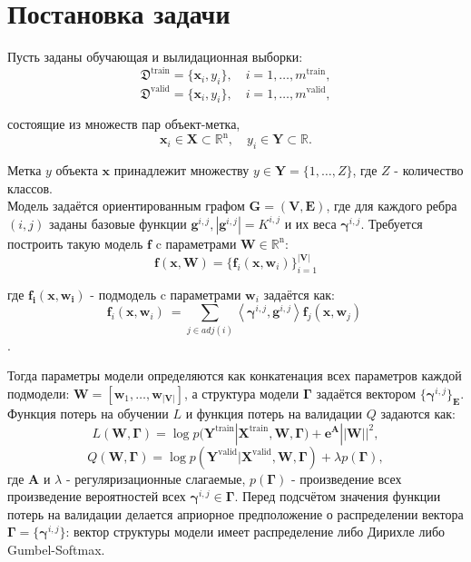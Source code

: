 \documentclass[12pt,twoside]{article}
\begin{document}
\section{Постановка задачи}

Пусть заданы обучающая и вылидационная выборки:
\[
\mathfrak{D}^{\text{train}} = \{\mathbf{x}_i, y_i\}, \quad i=1,\dots,m^{\text{train}},
\]
\[
\mathfrak{D}^{\text{valid}} = \{\mathbf{x}_i, y_i\}, \quad i=1,\dots,m^{\text{valid}},
\]

состоящие из множеств пар объект-метка,
\[
\mathbf{x}_i\in\mathbf{X}\subset\mathbb{R}^{\text{n}},\quad y_i\in\mathbf{Y}\subset\mathbb{R}.
\] 

Метка $y$ объекта $\mathbf{x}$ принадлежит множеству $y\in\mathbf{Y}= \{1,\dots,Z\}$, где $Z$ - количество классов.
\\

Модель задаётся ориентированным графом $\mathbf{G=(V,E)}$, где для каждого ребра $(i,j)$ заданы базовые функции $\mathbf{g}^{i,j}, |\mathbf{g}^{i,j}| = K^{i,j}$ и их веса $\boldsymbol{\gamma}^{i,j}$. Требуется построить такую модель $\mathbf{f}$ c параметрами $\mathbf{W}\in\mathbb{R}^\text{n}$:
\[
\mathbf{f}(\mathbf{x}, \mathbf{W})= \{ \mathbf{f}_i(\mathbf{x}, \mathbf{w}_i)\}_{i=1}^\mathbf{|V|}
\]

где $\mathbf{f_i(x, w_i)}$ - подмодель c параметрами $\mathbf{w}_i$ задаётся как:
\[
\mathbf{f}_i(\mathbf{x}, \mathbf{w}_i)\ = \sum_{j\in adj(i)} \left\langle {\boldsymbol{\gamma}^{i,j}, \mathbf{g}^{i,j}} \right\rangle \mathbf{f}_j(\mathbf{x}, \mathbf{w}_j)\
\].

Тогда параметры модели определяются как конкатенация всех параметров каждой подмодели: $\mathbf{W}=[\mathbf{w}_1,\dots,\mathbf{w}_\mathbf{|V|}]$, а структура модели $\boldsymbol{\Gamma}$ задаётся вектором $\{ \boldsymbol{\gamma}^{i,j}\}_\mathbf{E}$.
\\

Функция потерь на обучении $L$ и функция потерь на валидации $Q$ задаются как:
\[
L (\mathbf{W}, \boldsymbol{\Gamma})= \log p(\mathbf{Y}^\text{train}|\mathbf{X}^\text{train}, \mathbf{W}, \boldsymbol{\Gamma}) + \boldsymbol{e}^{\mathbf{A}}||\mathbf{W}||^2,
\]
\[
Q (\mathbf{W}, \boldsymbol{\Gamma})= \log p(\mathbf{Y}^\text{valid}|\mathbf{X}^\text{valid}, \mathbf{W}, \boldsymbol{\Gamma}) + \lambda p(\boldsymbol{\Gamma}),
\]
где $\mathbf{A}$ и $\lambda$ - регуляризационные слагаемые, $p(\boldsymbol{\Gamma})$ - произведение всех произведение вероятностей всех $\boldsymbol{\gamma}^{i,j} \in \boldsymbol{\Gamma}$. Перед подсчётом значения  функции потерь на валидации делается априорное предположение  о распределении вектора
$\boldsymbol{\Gamma} = \{ \boldsymbol{\gamma}^{i,j}\}$: вектор структуры модели имеет распределение либо Дирихле\cite{Dirichlet} либо Gumbel-Softmax\cite{Gumbell}.
\\
\end{document}

